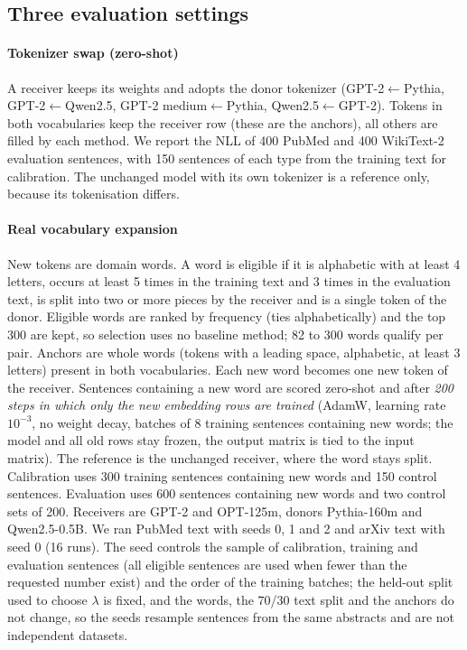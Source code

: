 \documentclass[preprint,12pt]{elsarticle}
\begin{document}
\subsection{Three evaluation settings}
\paragraph{Tokenizer swap (zero-shot)} A receiver keeps its weights and adopts the donor tokenizer (GPT-2$\leftarrow$Pythia, GPT-2$\leftarrow$Qwen2.5, GPT-2 medium$\leftarrow$Pythia, Qwen2.5$\leftarrow$GPT-2). Tokens in both vocabularies keep the receiver row (these are the anchors), all others are filled by each method. We report the NLL of 400 PubMed and 400 WikiText-2 evaluation sentences, with 150 sentences of each type from the training text for calibration. The unchanged model with its own tokenizer is a reference only, because its tokenisation differs.

\paragraph{Real vocabulary expansion}\label{par:rvprotocol} New tokens are domain words. A word is eligible if it is alphabetic with at least 4 letters, occurs at least 5 times in the training text and 3 times in the evaluation text, is split into two or more pieces by the receiver and is a single token of the donor. Eligible words are ranked by frequency (ties alphabetically) and the top 300 are kept, so selection uses no baseline method; 82 to 300 words qualify per pair. Anchors are whole words (tokens with a leading space, alphabetic, at least 3 letters) present in both vocabularies. Each new word becomes one new token of the receiver. Sentences containing a new word are scored zero-shot and after \emph{200 steps in which only the new embedding rows are trained} (AdamW, learning rate $10^{-3}$, no weight decay, batches of 8 training sentences containing new words; the model and all old rows stay frozen, the output matrix is tied to the input matrix). The reference is the unchanged receiver, where the word stays split. Calibration uses 300 training sentences containing new words and 150 control sentences. Evaluation uses 600 sentences containing new words and two control sets of 200. Receivers are GPT-2 and OPT-125m, donors Pythia-160m and Qwen2.5-0.5B. We ran PubMed text with seeds 0, 1 and 2 and arXiv text with seed 0 (16 runs). The seed controls the sample of calibration, training and evaluation sentences (all eligible sentences are used when fewer than the requested number exist) and the order of the training batches; the held-out split used to choose $\lambda$ is fixed, and the words, the 70/30 text split and the anchors do not change, so the seeds resample sentences from the same abstracts and are not independent datasets.
\end{document}
